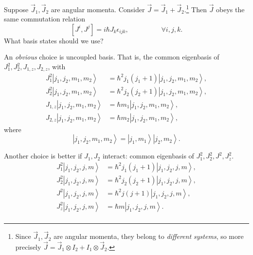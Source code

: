 \documentclass[phys334]{subfiles}
\begin{document}
    Suppose $\vec{J}_1, \vec{J}_2$ are angular momenta. Consider $\vec{J} = \vec{J}_1+\vec{J}_2$.\footnote{Since $\vec{J}_1,\vec{J}_2$ are angular momenta, they belong to \textit{different systems}, so more precisely $\vec{J} = \vec{J}_1\otimes I_2 + I_1\otimes \vec{J}_2$.} Then $\vec{J}$ obeys the same commutation relation
    \begin{equation*}
        \left[ J^i,J^j \right] = i\hbar J_k\epsilon_{ijk}, \hspace{2cm}\forall i,j,k.
    \end{equation*}
    What basis states should we use?

    An \textit{obvious} choice is uncoupled basis. That is, the common eigenbasis of $J_1^{2},J_2^{2},J_{1,z},J_{2,z}$, with
    \begin{equation*}
        \begin{aligned}
            J_1^{2}\left| j_1,j_2,m_1,m_2 \right\rangle & = \hbar^{2}j_1\left( j_1+1 \right)\left| j_1,j_2,m_1,m_2 \right\rangle, \\
            J_2^{2}\left| j_1,j_2,m_1,m_2 \right\rangle & = \hbar^{2}j_2\left( j_2+1 \right)\left| j_1,j_2,m_1,m_2 \right\rangle, \\
            J_{1,z}\left| j_1,j_2,m_1,m_2 \right\rangle & = \hbar m_1\left| j_1,j_2,m_1,m_2 \right\rangle, \\
            J_{2,z}\left| j_1,j_2,m_1,m_2 \right\rangle & = \hbar m_2\left| j_1,j_2,m_1,m_2 \right\rangle,
        \end{aligned} 
    \end{equation*}
    where
    \begin{equation*}
        \left| j_1,j_2,m_1,m_2 \right\rangle = \left| j_1,m_1 \right\rangle\left| j_2,m_2 \right\rangle.
    \end{equation*}

    Another choice is better if $J_1,J_2$ interact: common eigenbasis of $J_1^{2},J_2^{2},J^{2},J_z^{2}$.
    \begin{equation*}
        \begin{aligned}
            J_1^{2}\left| j_1,j_2,j,m \right\rangle & = \hbar^{2}j_1\left( j_1+1 \right)\left| j_1,j_2,j,m \right\rangle, \\
            J_2^{2}\left| j_1,j_2,j,m \right\rangle & = \hbar^{2}j_2\left( j_2+1 \right)\left| j_1,j_2,j,m \right\rangle, \\
            J^{2}\left| j_1,j_2,j,m \right\rangle & = \hbar^{2}j\left( j+1 \right)\left| j_1,j_2,j,m \right\rangle, \\
            J_z^{2}\left| j_1,j_2,j,m \right\rangle & = \hbar m\left| j_1,j_2,j,m \right\rangle. \\
        \end{aligned} 
    \end{equation*}
    
\end{document}
